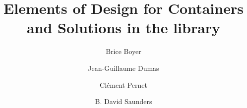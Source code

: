 \documentclass[runningheads,a4paper]{llncs}
\title{Elements of Design for Containers and Solutions in the \linbox library}
\author{Brice Boyer\inst{1}
%
\and Jean-Guillaume Dumas\inst{2}
%
\and Cl\'ement Pernet\inst{3}
%
\and B. David Saunders\inst{4}
}
\institute{%
	North Carolina State University, Department of Mathematics, Raleigh,
	NC, USA\footnote{This material is based on work supported in part by
	the National Science Foundation under Grant CCF-1115772 (Kaltofen)},
	\mailto{bbboyer@ncsu.edu}.
	\and
	Laboratoire J. Kuntzmann, Universit\'e de Grenoble. 51, rue des
	Math\'ematiques, umr CNRS 5224, bp 53X, F38041 Grenoble, France,
	\mailto{Jean-Guillaume.Dumas@imag.fr}.
	\and
	Laboratoire LIG, Universit\'e de Grenoble et INRIA. umr CNRS, F38330
	Montbonnot, France,
	\mailto{clement.pernet@imag.fr}.
%
	\and
	University of Delaware, Computer and Information Science Department.
	Newark / DE / 19716, USA,
	\mailto{saunders@udel.edu}.%
}
\date{}
\newif\ifAbstractOnly
\begin{document}
\maketitle



\ifAbstractOnly
\else



%

%
%
%

%
%
%
%


%

%
%
%
%

%
%
%
%
\fi %



%
%
\end{document}
